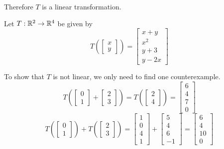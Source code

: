 \begin{applicationActivities}
\begin{example}
Therefore \(T\) is a linear transformation.
\end{example}

\begin{example}
Let \(T : \mathbb{R}^2 \rightarrow \mathbb{R}^4\) be given by
\[
  T\left(\begin{bmatrix} x \\ y \end{bmatrix} \right)
=
  \begin{bmatrix} x+y \\ x^2 \\ y+3 \\ y-2x \end{bmatrix}
\]

To show that \(T\) is not linear, we only need to find one
counterexample.
\[
  T\left(
    \begin{bmatrix} 0 \\ 1 \end{bmatrix} +
    \begin{bmatrix} 2 \\ 3 \end{bmatrix}
  \right)
=
  T\left(
    \begin{bmatrix} 2 \\ 4 \end{bmatrix}
  \right) =
  \begin{bmatrix} 6 \\ 4 \\ 7 \\ 0 \end{bmatrix}
\]
\[
  T\left(
    \begin{bmatrix} 0 \\ 1 \end{bmatrix}
  \right) + T\left(
    \begin{bmatrix} 2 \\ 3\end{bmatrix}
  \right)
=
  \begin{bmatrix} 1 \\ 0 \\ 4 \\ 1 \end{bmatrix} +
  \begin{bmatrix} 5 \\ 4 \\ 6 \\ -1 \end{bmatrix} =
  \begin{bmatrix} 6 \\ 4 \\ 10 \\ 0 \end{bmatrix}
\]


\end{example}
\end{applicationActivities}
